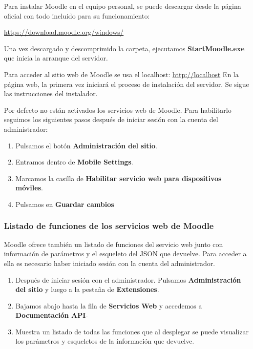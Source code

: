 Para instalar Moodle en el equipo personal, se puede descargar desde la página oficial con todo incluido para su funcionamiento:

\href{https://download.moodle.org/windows/}{https://download.moodle.org/windows/}

Una vez descargado y descomprimido la carpeta, ejecutamos \textbf{StartMoodle.exe} que inicia la  arranque del servidor.

Para acceder al sitio web de Moodle se usa el localhost: \href{http://localhost}{http://localhost}
En la página web, la primera vez iniciará el proceso de instalación del servidor. Se sigue las instrucciones del instalador.

Por defecto no están activados los servicios web de Moodle. Para habilitarlo seguimos los siguientes pasos después de iniciar sesión con la cuenta del administrador:

\begin{enumerate}
	
	\item Pulsamos el botón \textbf{Administración del sitio}.
	\item Entramos dentro de \textbf{Mobile Settings}.
	\item Marcamos la casilla de \textbf{Habilitar servicio web para dispositivos móviles}.
	\item Pulsamos en \textbf{Guardar cambios}
\end{enumerate}

\subsubsection{Listado de funciones de los servicios web de Moodle}

Moodle ofrece también un listado de funciones del servicio web junto con información de parámetros y el esqueleto del JSON que devuelve. Para acceder a ella es necesario haber iniciado sesión con la cuenta del administrador.
\begin{enumerate}
	\item Después de iniciar sesión con el administrador. Pulsamos \textbf{Administración del sitio} y luego a la pestaña de \textbf{Extensiones}.
	\item Bajamos abajo hasta la fila de \textbf{Servicios Web} y accedemos a \textbf{Documentación API}-
	\item Muestra un listado de todas las funciones que al desplegar se puede visualizar los parámetros y esqueletos de la información que devuelve.
\end{enumerate}

